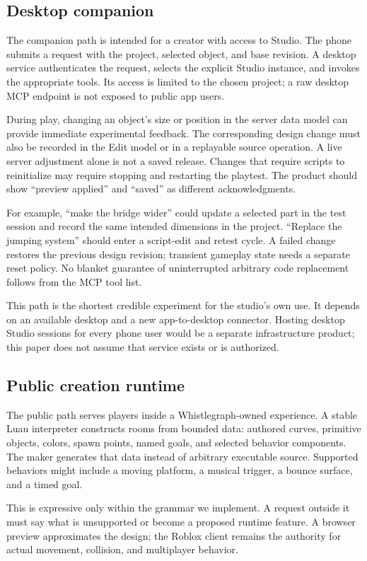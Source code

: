\documentclass[10pt,letterpaper,twocolumn]{article}
\begin{document}
\subsection{Desktop companion}
The companion path is intended for a creator with access to Studio. The phone submits a request with the project, selected object, and base revision. A desktop service authenticates the request, selects the explicit Studio instance, and invokes the appropriate tools. Its access is limited to the chosen project; a raw desktop MCP endpoint is not exposed to public app users.

During play, changing an object's size or position in the server data model can provide immediate experimental feedback. The corresponding design change must also be recorded in the Edit model or in a replayable source operation. A live server adjustment alone is not a saved release. Changes that require scripts to reinitialize may require stopping and restarting the playtest. The product should show ``preview applied'' and ``saved'' as different acknowledgments.

For example, ``make the bridge wider'' could update a selected part in the test session and record the same intended dimensions in the project. ``Replace the jumping system'' should enter a script-edit and retest cycle. A failed change restores the previous design revision; transient gameplay state needs a separate reset policy. No blanket guarantee of uninterrupted arbitrary code replacement follows from the MCP tool list.

This path is the shortest credible experiment for the studio's own use. It depends on an available desktop and a new app-to-desktop connector. Hosting desktop Studio sessions for every phone user would be a separate infrastructure product; this paper does not assume that service exists or is authorized.

\subsection{Public creation runtime}
The public path serves players inside a Whistlegraph-owned experience. A stable Luau interpreter constructs rooms from bounded data: authored curves, primitive objects, colors, spawn points, named goals, and selected behavior components. The maker generates that data instead of arbitrary executable source. Supported behaviors might include a moving platform, a musical trigger, a bounce surface, and a timed goal.

This is expressive only within the grammar we implement. A request outside it must say what is unsupported or become a proposed runtime feature. A browser preview approximates the design; the Roblox client remains the authority for actual movement, collision, and multiplayer behavior.
\end{document}
